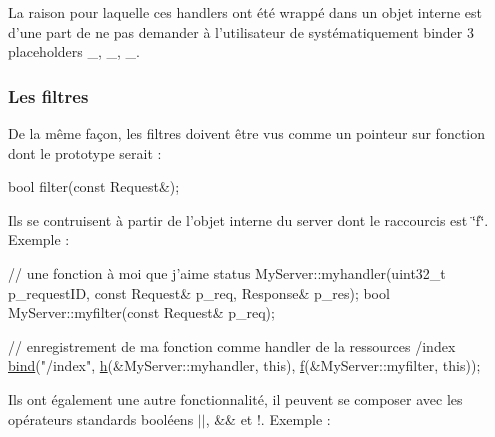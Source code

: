 La raison pour laquelle ces handlers ont été wrappé dans un objet interne est d'une part de ne pas demander à l'utilisateur de systématiquement binder 3 placeholders \-\_, \-\_, \-\_.

\par
 \subsubsection*{Les filtres }

De la même façon, les filtres doivent être vus comme un pointeur sur fonction dont le prototype serait \-: 
\begin{DoxyCode}
\textcolor{keywordtype}{bool} filter(\textcolor{keyword}{const} Request&);
\end{DoxyCode}


Ils se contruisent à partir de l'objet interne du server dont le raccourcis est \char`\"{}f\char`\"{}. Exemple \-: 
\begin{DoxyCode}
\textcolor{comment}{// une fonction à moi que j'aime}
status MyServer::myhandler(uint32\_t p\_requestID, \textcolor{keyword}{const} Request& p\_req, Response& p\_res);
\textcolor{keywordtype}{bool}  MyServer::myfilter(\textcolor{keyword}{const} Request& p\_req);

\textcolor{comment}{// enregistrement de ma fonction comme handler de la ressources /index}
\hyperlink{classxtd_1_1network_1_1http_1_1Server_a7281ae7cdda6d7b2334b27e530ce000f}{bind}(\textcolor{stringliteral}{"/index"}, \hyperlink{classxtd_1_1network_1_1http_1_1Server_adfa2951649119f630d33ce9083bd989c}{h}(&MyServer::myhandler, \textcolor{keyword}{this}), \hyperlink{classxtd_1_1network_1_1http_1_1Server_a49f38021cb4d61f2c3027785f8fa561c}{f}(&MyServer::myfilter, \textcolor{keyword}{this}));
\end{DoxyCode}


Ils ont également une autre fonctionnalité, il peuvent se composer avec les opérateurs standards booléens $\vert$$\vert$, \&\& et !. Exemple \-:


